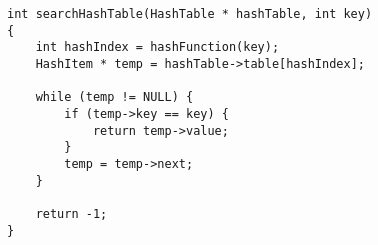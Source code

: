 \begin{lstlisting}[style=CStyle]
int searchHashTable(HashTable * hashTable, int key) 
{
    int hashIndex = hashFunction(key);
    HashItem * temp = hashTable->table[hashIndex];

    while (temp != NULL) {
        if (temp->key == key) {
            return temp->value;
        }
        temp = temp->next;
    }

    return -1;
}
\end{lstlisting}
                